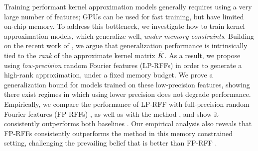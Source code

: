 



Training performant kernel approximation models generally requires using a very large number of features; GPUs can be used for fast training, but have limited on-chip memory. To address this bottleneck, we investigate how to train kernel approximation models, which generalize well, \emph{under memory constraints}.  Building on the recent work of \citeauthor{avron17}\citep{avron17}, we argue that generalization performance is intrinsically tied to the \emph{rank} of the approximate kernel matrix $\tilde{K}$. As a result, we propose using \emph{low-precision} random Fourier features (LP-RFFs) in order to generate a high-rank approximation, under a fixed memory budget. We prove a generalization bound for models trained on these low-precision features, showing there exist regimes in which using lower precision does not degrade performance. Empirically, we compare the performance of LP-RFF with full-precision random Fourier features (FP-RFFs) \citep{rahimi07random}, as well as with the \Nystrom method \citep{nystrom}, and show it consistently outperforms both baselines . Our empirical analysis also reveals that FP-RFFs consistently outperforms the \Nystrom method in this memory constrained setting, challenging the prevailing belief that \Nystrom is better than FP-RFF \citep{nysvsrff12}.





